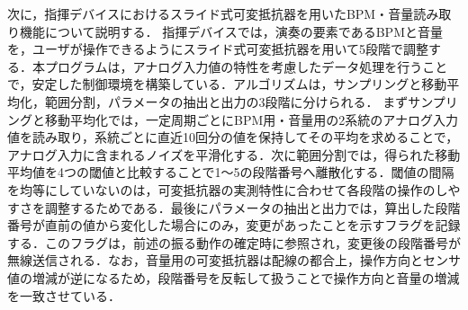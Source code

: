 
\fi



\label{sec:pot_detail}
次に，指揮デバイスにおけるスライド式可変抵抗器を用いたBPM・音量読み取り機能について説明する．
指揮デバイスでは，演奏の要素であるBPMと音量を，ユーザが操作できるようにスライド式可変抵抗器を用いて5段階で調整する．本プログラムは，アナログ入力値の特性を考慮したデータ処理を行うことで，安定した制御環境を構築している．アルゴリズムは，サンプリングと移動平均化，範囲分割，パラメータの抽出と出力の3段階に分けられる．
まずサンプリングと移動平均化では，一定周期ごとにBPM用・音量用の2系統のアナログ入力値を読み取り，系統ごとに直近10回分の値を保持してその平均を求めることで，アナログ入力に含まれるノイズを平滑化する．次に範囲分割では，得られた移動平均値を4つの閾値と比較することで1〜5の段階番号へ離散化する．閾値の間隔を均等にしていないのは，可変抵抗器の実測特性に合わせて各段階の操作のしやすさを調整するためである．最後にパラメータの抽出と出力では，算出した段階番号が直前の値から変化した場合にのみ，変更があったことを示すフラグを記録する．このフラグは，前述の振る動作の確定時に参照され，変更後の段階番号が無線送信される．なお，音量用の可変抵抗器は配線の都合上，操作方向とセンサ値の増減が逆になるため，段階番号を反転して扱うことで操作方向と音量の増減を一致させている．





